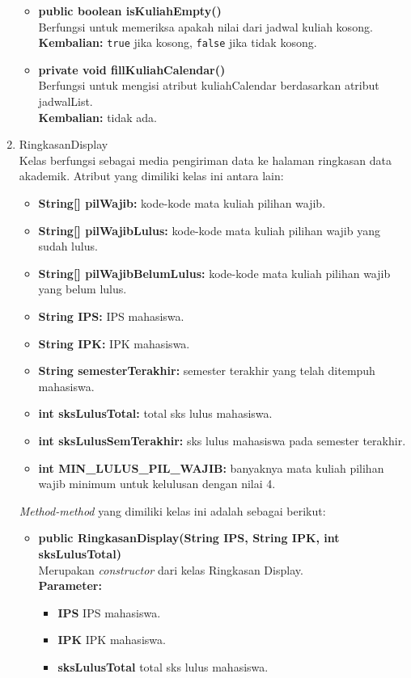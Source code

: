 \begin{enumerate}
\begin{itemize}
		\item \textbf{public boolean isKuliahEmpty()}\\
				Berfungsi untuk memeriksa apakah nilai dari jadwal kuliah kosong.\\
				\textbf{Kembalian:} \texttt{true} jika kosong, \texttt{false} jika tidak kosong.
		
		\item \textbf{private void fillKuliahCalendar()}\\
				Berfungsi untuk mengisi atribut kuliahCalendar berdasarkan atribut jadwalList.\\
				\textbf{Kembalian:} tidak ada.
		\end{itemize}
		
				\item RingkasanDisplay\\
		Kelas berfungsi sebagai media pengiriman data ke halaman ringkasan data akademik. Atribut yang dimiliki kelas ini antara lain:
		\begin{itemize}
			\item \textbf{String[] pilWajib:} kode-kode mata kuliah pilihan wajib.
			\item \textbf{String[] pilWajibLulus:} kode-kode mata kuliah pilihan wajib yang sudah lulus.
			\item \textbf{String[] pilWajibBelumLulus:} kode-kode mata kuliah pilihan wajib yang belum lulus.
			\item \textbf{String IPS:} IPS mahasiswa.
			\item \textbf{String IPK:} IPK mahasiswa.
			\item \textbf{String semesterTerakhir:} semester terakhir yang telah ditempuh mahasiswa.
			\item \textbf{int sksLulusTotal:} total sks lulus mahasiswa.
			\item \textbf{int sksLulusSemTerakhir:} sks lulus mahasiswa pada semester terakhir.
			\item \textbf{int MIN\_LULUS\_PIL\_WAJIB:} banyaknya mata kuliah pilihan wajib minimum untuk kelulusan dengan nilai 4.
		\end{itemize}
		\textit{Method-method} yang dimiliki kelas ini adalah sebagai berikut:
		\begin{itemize}
			\item \textbf{public RingkasanDisplay(String IPS, String IPK, int sksLulusTotal)}\\
			Merupakan \textit{constructor} dari kelas Ringkasan Display.\\
			\textbf{Parameter:}
			\begin{itemize}
				\item \textbf{IPS} IPS mahasiswa.
				\item \textbf{IPK} IPK mahasiswa.
				\item \textbf{sksLulusTotal} total sks lulus mahasiswa.
			\end{itemize}
			

\end{itemize}
\end{enumerate}
